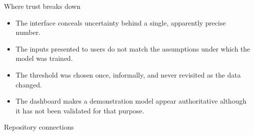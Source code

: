 \begin{frame}{Where trust breaks down}
\begin{itemize}
\item The interface conceals uncertainty behind a single, apparently precise number.
\item The inputs presented to users do not match the assumptions under which the model was trained.
\item The threshold was chosen once, informally, and never revisited as the data changed.
\item The dashboard makes a demonstration model appear authoritative although it has not been validated for that purpose.
\end{itemize}
\coursefooter
\end{frame}

\begin{frame}{Repository connections}
\coursefooter
\end{frame}

